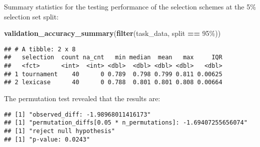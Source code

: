 \documentclass[
]{book}
\newenvironment{Shaded}{\begin{snugshade}}{\end{snugshade}}
\newcommand{\AttributeTok}[1]{\textcolor[rgb]{0.13,0.29,0.53}{#1}}
\newcommand{\DecValTok}[1]{\textcolor[rgb]{0.00,0.00,0.81}{#1}}
\newcommand{\FunctionTok}[1]{\textcolor[rgb]{0.13,0.29,0.53}{\textbf{#1}}}
\newcommand{\NormalTok}[1]{#1}
\newcommand{\OtherTok}[1]{\textcolor[rgb]{0.56,0.35,0.01}{#1}}
\newcommand{\SpecialCharTok}[1]{\textcolor[rgb]{0.81,0.36,0.00}{\textbf{#1}}}
\newcommand{\StringTok}[1]{\textcolor[rgb]{0.31,0.60,0.02}{#1}}
\begin{document}
Summary statistics for the testing performance of the selection schemes at the 5\% selection set split:

\begin{Shaded}
\begin{Highlighting}[]
\FunctionTok{validation\_accuracy\_summary}\NormalTok{(}\FunctionTok{filter}\NormalTok{(task\_data, split }\SpecialCharTok{==} \StringTok{\textquotesingle{}95\%\textquotesingle{}}\NormalTok{))}
\end{Highlighting}
\end{Shaded}

\begin{verbatim}
## # A tibble: 2 x 8
##   selection  count na_cnt   min median  mean   max     IQR
##   <fct>      <int>  <int> <dbl>  <dbl> <dbl> <dbl>   <dbl>
## 1 tournament    40      0 0.789  0.798 0.799 0.811 0.00625
## 2 lexicase      40      0 0.788  0.801 0.801 0.808 0.00664
\end{verbatim}

The permutation test revealed that the results are:

\begin{Shaded}
\end{Shaded}

\begin{verbatim}
## [1] "observed_diff: -1.98968011416173"
## [1] "permutation_diffs[0.05 * n_permutations]: -1.69407255656074"
## [1] "reject null hypothesis"
## [1] "p-value: 0.0243"
\end{verbatim}
\end{document}
